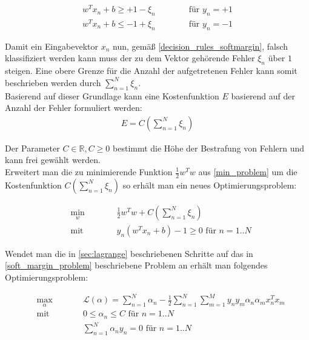 \documentclass[a4paper,11pt,twoside]{scrreprt}
\newcommand{\Lagr}{\mathcal{L}}
\begin{document}
\begin{subequations} \label{decision_rules_softmargin}
	\begin{alignat}{2}
		w^{T} x_{n} + b \geq +1 - \xi_{n}& \qquad & \text{ für } y_{n} = +1\\
		w^{T} x_{n} + b \leq -1 + \xi_{n}& & \text{ für } y_{n} = -1
	\end{alignat}
\end{subequations}


Damit ein Eingabevektor $x_{n}$ nun, gemäß \autoref{decision_rules_softmargin}, falsch klassifiziert werden kann muss der zu dem Vektor gehörende Fehler $\xi_{n}$ über $1$ steigen. Eine obere Grenze für die Anzahl der aufgetretenen Fehler kann somit beschrieben werden durch $\sum_{n=1}^{N} \xi_{n}$. \\

Basierend auf dieser Grundlage kann eine Kostenfunktion $E$ basierend auf der Anzahl der Fehler formuliert werden:
\begin{equation} \label{soft_margin_error_cost_function}
	\begin{aligned}
		E = C(\sum_{n=1}^{N} \xi_{n})
	\end{aligned}
\end{equation}

Der Parameter $C \in \mathbb{R}, C \geq 0$ bestimmt die Höhe der Bestrafung von Fehlern und kann frei gewählt werden. \\


Erweitert man die zu minimierende Funktion $\frac{1}{2} w^{T} w $ aus \autoref{min_problem} um die Kostenfunktion $C(\sum_{n=1}^{N} \xi_{n})$ so erhält man ein neues Optimierungsproblem:

\begin{subequations} \label{soft_margin_problem}
	\begin{alignat}{2}
		&\!\min_{w}        &\qquad&  \frac{1}{2} w^{T} w + C(\sum_{n=1}^{N} \xi_{n}) \label{eq:optProbsoft}\\
		&\text{mit } &      & y_n (w^{T} x_{n} + b)-1 \geq 0 \text{ für } n=1..N \label{eq:constraintsoft}
	\end{alignat}
\end{subequations}

Wendet man die in \autoref{sec:lagrange} beschriebenen Schritte auf das in \autoref{soft_margin_problem} beschriebene Problem an erhält man folgendes Optimierungsproblem:

\begin{subequations} \label{final_lagrange_soft}
	\begin{alignat}{2}
		&\!\max_{\alpha}        &\qquad&  	\Lagr(\alpha) = \sum_{n=1}^{N} \alpha_{n} - \frac{1}{2} \sum_{n=1}^{N} \sum_{m=1}^{M} y_{n} y_{m} \alpha_{n} \alpha_{m} x_{n}^{T} x_{m} \label{eq:soft_margin_final}\\
		&\text{mit } &      & 0 \leq \alpha_{n} \leq C \text{ für } n=1..N \label{eq:constraint_soft}\\
		&       & & \sum_{n=1}^{N} \alpha_{n} y_{n} = 0\text{ für } n=1..N
	\end{alignat}
\end{subequations}
\end{document}
